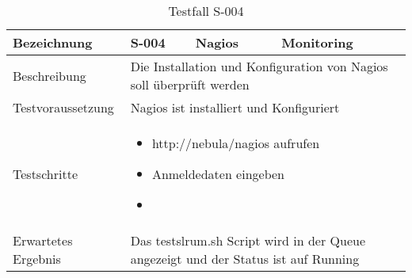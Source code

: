 \begin{table}[H]
\centering
\begin{tabular}{|p{4cm}|p{4cm}|p{4cm}|p{4cm}|}
\hline
Bezeichnung & \textbf{S-004} & Nagios & Monitoring \\\hline
Beschreibung & \multicolumn{3}{p{12cm}|}{Die Installation und Konfiguration von Nagios soll überprüft werden} \\\hline
Testvoraussetzung & \multicolumn{3}{p{12cm}|}{Nagios ist installiert und Konfiguriert} \\\hline
Testschritte & \multicolumn{3}{p{12cm}|}{\begin{itemize}
\item http://nebula/nagios aufrufen
\item Anmeldedaten eingeben
\item 
\end{itemize}} \\ \hline
Erwartetes Ergebnis & \multicolumn{3}{p{12cm}|}{Das testslrum.sh Script wird in der Queue angezeigt und der Status ist auf Running}\\\hline
\end{tabular}
\caption{Testfall S-004}
\label{Testfall S-004}
\end{table}